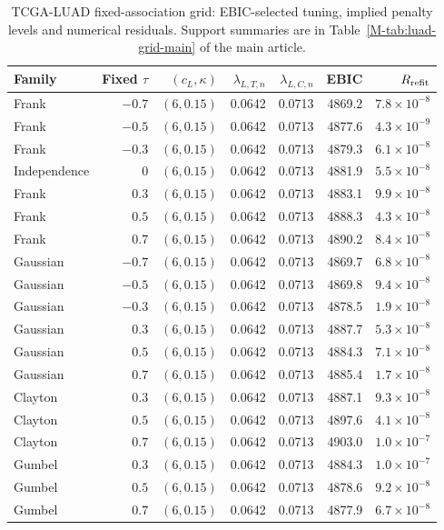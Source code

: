 \begin{table}[!htbp]
\centering
\caption{TCGA-LUAD fixed-association grid: EBIC-selected tuning, implied penalty levels and numerical residuals. Support summaries are in Table~\ref{M-tab:luad-grid-main} of the main article.}
\label{tab:luad-fixed-supp}
\small
\setlength{\tabcolsep}{4pt}
\begin{tabular}{lrrrrrr}
\toprule
Family & Fixed \(\tau\) & $(c_L,\kappa)$ & $\lambda_{L,T,n}$ & $\lambda_{L,C,n}$ & EBIC & $R_{\rm refit}$\\
\midrule
Frank & $-0.7$ & $(6,0.15)$ & 0.0642 & 0.0713 & 4869.2 & $7.8\times10^{-8}$ \\
Frank & $-0.5$ & $(6,0.15)$ & 0.0642 & 0.0713 & 4877.6 & $4.3\times10^{-9}$ \\
Frank & $-0.3$ & $(6,0.15)$ & 0.0642 & 0.0713 & 4879.3 & $6.1\times10^{-8}$ \\
Independence & $0$ & $(6,0.15)$ & 0.0642 & 0.0713 & 4881.9 & $5.5\times10^{-8}$ \\
Frank & $0.3$ & $(6,0.15)$ & 0.0642 & 0.0713 & 4883.1 & $9.9\times10^{-8}$ \\
Frank & $0.5$ & $(6,0.15)$ & 0.0642 & 0.0713 & 4888.3 & $4.3\times10^{-8}$ \\
Frank & $0.7$ & $(6,0.15)$ & 0.0642 & 0.0713 & 4890.2 & $8.4\times10^{-8}$ \\
\addlinespace
Gaussian & $-0.7$ & $(6,0.15)$ & 0.0642 & 0.0713 & 4869.7 & $6.8\times10^{-8}$ \\
Gaussian & $-0.5$ & $(6,0.15)$ & 0.0642 & 0.0713 & 4869.8 & $9.4\times10^{-8}$ \\
Gaussian & $-0.3$ & $(6,0.15)$ & 0.0642 & 0.0713 & 4878.5 & $1.9\times10^{-8}$ \\
Gaussian & $0.3$ & $(6,0.15)$ & 0.0642 & 0.0713 & 4887.7 & $5.3\times10^{-8}$ \\
Gaussian & $0.5$ & $(6,0.15)$ & 0.0642 & 0.0713 & 4884.3 & $7.1\times10^{-8}$ \\
Gaussian & $0.7$ & $(6,0.15)$ & 0.0642 & 0.0713 & 4885.4 & $1.7\times10^{-8}$ \\
\addlinespace
Clayton & $0.3$ & $(6,0.15)$ & 0.0642 & 0.0713 & 4887.1 & $9.3\times10^{-8}$ \\
Clayton & $0.5$ & $(6,0.15)$ & 0.0642 & 0.0713 & 4897.6 & $4.1\times10^{-8}$ \\
Clayton & $0.7$ & $(6,0.15)$ & 0.0642 & 0.0713 & 4903.0 & $1.0\times10^{-7}$ \\
\addlinespace
Gumbel & $0.3$ & $(6,0.15)$ & 0.0642 & 0.0713 & 4884.3 & $1.0\times10^{-7}$ \\
Gumbel & $0.5$ & $(6,0.15)$ & 0.0642 & 0.0713 & 4878.6 & $9.2\times10^{-8}$ \\
Gumbel & $0.7$ & $(6,0.15)$ & 0.0642 & 0.0713 & 4877.9 & $6.7\times10^{-8}$ \\
\bottomrule
\end{tabular}
\end{table}

